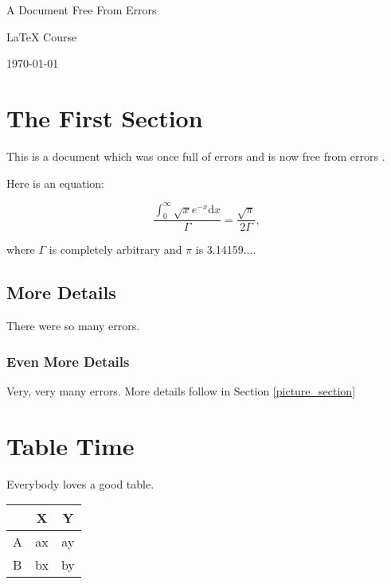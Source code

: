 \documentclass[12pt,a4paper]{article}
\begin{document}
\begin{titlepage}

\begin{center}
{\huge A Document Free From Errors}

\vspace{5cm}

LaTeX Course

\vspace{2cm}

\today
\end{center}

\end{titlepage}

\tableofcontents

\section{The First Section}

This is a document which was once full of errors and is now free from errors \cite{fakenews}.

Here is an equation:

\begin{equation}
\frac{\int_{0}^{\infty}\sqrt{x}e^{-x}\textrm{d}x}{\Gamma}=\frac{\sqrt{\pi}}{2\Gamma},\label{a_buggy_equation}
\end{equation}

where $\Gamma$ is completely arbitrary and $\pi$ is 3.14159....

\subsection{More Details}

There were so many errors.

\subsubsection{Even More Details}

Very, very many errors. More details follow in Section \ref{picture_section}

\section{Table Time}

Everybody loves a good table.

\begin{table}[hbt]
  \centering  
  \begin{tabular}{ l |  c  c }    
      	& X	& Y  	\\   
    \hline    
    A	& ax	& ay	\\ 
    B	& bx	& by 
  \end{tabular}  
\end{table}
\end{document}
